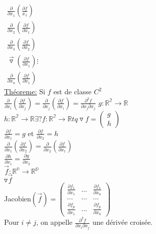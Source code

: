 \documentclass{article}
\begin{document}
    $\begin{matrix}
        \frac{\partial}{\partial x_1}(\frac{\partial f}{x_1})\\
        \frac{\partial}{\partial x_2}(\frac{\partial f}{\partial x_1})\\
        \frac{\partial}{\partial x_3}(\frac{\partial f}{\partial x_2})
    \end{matrix}$\\
    \hspace*{1.5cm}
    $\begin{matrix}
        \vec{\triangledown}(\frac{\partial f}{\partial x_1}) \vdots\\
        \frac{\partial}{\partial x_n}(\frac{\partial f}{\partial x_1})
    \end{matrix}$\\
    \underline{Théoreme:} Si $f$ est de classe $C^2$\\
    $\frac{\partial}{\partial x_i}(\frac{\partial f}{\partial x_j}) =\frac{\partial}{\partial x_j}(\frac{\partial f}{\partial x_i})=\frac{\partial^2 f}{\partial x_j \partial x_j}$
    $g:\mathbb{R^2}\to \mathbb{R}$\\
    $h:\mathbb{R^2}\to \mathbb{R}$\hspace*{1cm}$\exists ? f: \mathbb{R^2} \to \mathbb{R} tq \triangledown f=
    \begin{pmatrix}
        g\\
        h
    \end{pmatrix}$\\
    $\frac{\partial f}{\partial x_1} = g$ et
    $\frac{\partial f}{\partial x_2} = h$\\
    $\frac{\partial}{\partial x_1}(\frac{\partial f}{\partial x_2})=\frac{\partial}{\partial x_2}(\frac{\partial f}{\partial x_1})$\\
    $\frac{\partial h}{\partial x_1}=\frac{\partial g}{\partial x_2}$\\
    $\vec{f}:\mathbb{R^n}\to \mathbb{R^p}$\\
    $\triangledown \vec{f}$\\
    Jacobien$(\vec{f})=
    \begin{pmatrix}
        \frac{\partial f_1}{\partial x_1}&...&\frac{\partial f_1}{\partial x_n}\\
        ...&...&...\\
        \frac{\partial f_p}{\partial x_1}&...&\frac{\partial f_p}{\partial x_n}
    \end{pmatrix}$\\
    Pour $i\neq j$, on appelle $\frac{\partial^2 f}{\partial x_i \partial x_j}$ une dérivée croisée.\\
\end{document}
